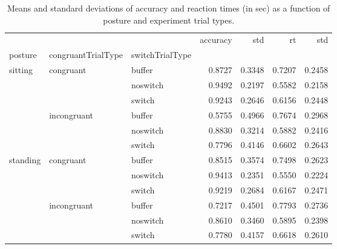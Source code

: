 \begin{table}
\centering
\caption{Means and standard deviations of accuracy and reaction times (in sec) as a function of posture and experiment trial types.}
\label{table-task-switching-replication-reaction-time}
\begin{tabular}{lllrrrr}
\toprule
         &             &        & accuracy &    std &     rt &    std \\
posture & congruantTrialType & switchTrialType &          &        &        &        \\
\midrule
sitting & congruant & buffer &   0.8727 & 0.3348 & 0.7207 & 0.2458 \\
         &             & noswitch &   0.9492 & 0.2197 & 0.5582 & 0.2158 \\
         &             & switch &   0.9243 & 0.2646 & 0.6156 & 0.2448 \\
         & incongruant & buffer &   0.5755 & 0.4966 & 0.7674 & 0.2968 \\
         &             & noswitch &   0.8830 & 0.3214 & 0.5882 & 0.2416 \\
         &             & switch &   0.7796 & 0.4146 & 0.6602 & 0.2643 \\
standing & congruant & buffer &   0.8515 & 0.3574 & 0.7498 & 0.2623 \\
         &             & noswitch &   0.9413 & 0.2351 & 0.5550 & 0.2224 \\
         &             & switch &   0.9219 & 0.2684 & 0.6167 & 0.2471 \\
         & incongruant & buffer &   0.7217 & 0.4501 & 0.7793 & 0.2736 \\
         &             & noswitch &   0.8610 & 0.3460 & 0.5895 & 0.2398 \\
         &             & switch &   0.7780 & 0.4157 & 0.6618 & 0.2610 \\
\bottomrule
\end{tabular}
\end{table}
